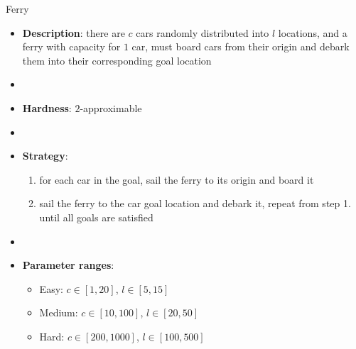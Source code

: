 \documentclass[aspectratio=169,xcolor=dvipsnames]{beamer}
\begin{document}
\begin{frame}{Ferry}

    \begin{itemize}
        \item \textbf{Description}: there are $c$ cars randomly distributed into $l$ locations, and a ferry with capacity for $1$ car, must board cars from their origin and debark them into their corresponding goal location
        \item[]
        \item \textbf{Hardness}: $2$-approximable %
        \item[]
        \item \textbf{Strategy}: 
        \begin{enumerate}
            \item for each car in the goal, sail the ferry to its origin and board it
            \item sail the ferry to the car goal location and debark it, repeat from step 1. until all goals are satisfied
        \end{enumerate}
        \item[] 
        \item \textbf{Parameter ranges}:
        \begin{itemize}
            \item Easy: $c\in[1, 20]$, $l \in [5, 15]$
            \item Medium: $c\in[10, 100]$, $l \in [20, 50]$
            \item Hard: $c\in[200, 1000]$, $l \in [100, 500]$
        \end{itemize}
    \end{itemize}

\end{frame}
\end{document}

